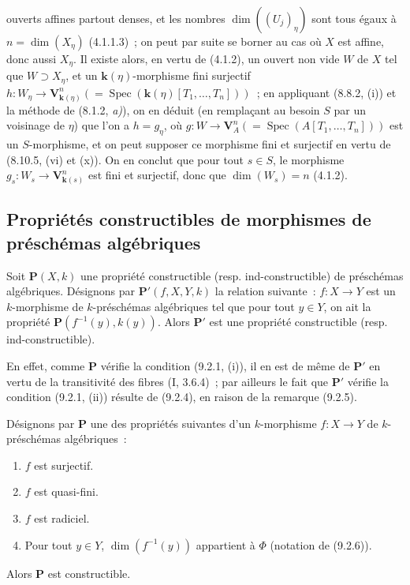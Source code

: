 ouverts affines partout denses, et les nombres $\dim((U_j)_\eta)$ sont tous
égaux à $n=\dim(X_\eta)$ (4.1.1.3)~; on peut par suite se borner au cas où $X$
est affine, donc aussi $X_\eta$. Il existe alors, en vertu de (4.1.2), un
ouvert non vide $W$ de $X$ tel que $W\supset X_\eta$, et un
$\mathbf{k}(\eta)$-morphisme fini surjectif
$h:W_\eta\to\mathbf V_{\mathbf{k}(\eta)}^n
(=\operatorname{Spec}(\mathbf{k}(\eta)[T_1,\ldots,T_n]))$~; en appliquant
(8.8.2, (i)) et la méthode de (8.1.2, \emph{a)}), on en déduit (en remplaçant
au besoin $S$ par un voisinage de $\eta$) que l'on a $h=g_\eta$, où
$g:W\to\mathbf V_A^n(=\operatorname{Spec}(A[T_1,\ldots,T_n]))$ est un
$S$-morphisme, et on peut supposer ce morphisme fini et surjectif en vertu de
(8.10.5, (vi) et (x)). On en conclut que pour tout $s\in S$, le morphisme
$g_s:W_s\to\mathbf V_{\mathbf{k}(s)}^n$ est fini et surjectif, donc que
$\dim(W_s)=n$ (4.1.2).

\subsection{Propriétés constructibles de morphismes de préschémas algébriques}

\begin{proposition}[9.3.1]
\label{IV.9.3.1-fr}
Soit $\mathbf P(X,k)$ une propriété constructible (resp. ind-constructible)
de préschémas algébriques. Désignons par $\mathbf P'(f,X,Y,k)$ la relation
suivante~: $f:X\to Y$ est un $k$-morphisme de $k$-préschémas algébriques tel
que pour tout $y\in Y$, on ait la propriété
$\mathbf P(f^{-1}(y),k(y))$. Alors $\mathbf P'$ est une propriété
constructible (resp. ind-constructible).
\end{proposition}

En effet, comme $\mathbf P$ vérifie la condition (9.2.1, (i)), il en est de
même de $\mathbf P'$ en vertu de la transitivité des fibres (I, 3.6.4)~; par
ailleurs le fait que $\mathbf P'$ vérifie la condition (9.2.1, (ii)) résulte
de (9.2.4), en raison de la remarque (9.2.5).

\begin{proposition}[9.3.2]
\label{IV.9.3.2-fr}
Désignons par $\mathbf P$ une des propriétés suivantes d'un $k$-morphisme
$f:X\to Y$ de $k$-préschémas algébriques~:
\begin{enumerate}[label=(\roman*)]
  \item $f$ est surjectif.
  \item $f$ est quasi-fini.
  \item $f$ est radiciel.
  \item Pour tout $y\in Y$, $\dim(f^{-1}(y))$ appartient à $\Phi$ (notation
  de (9.2.6)).
\end{enumerate}
Alors $\mathbf P$ est constructible.
\end{proposition}

